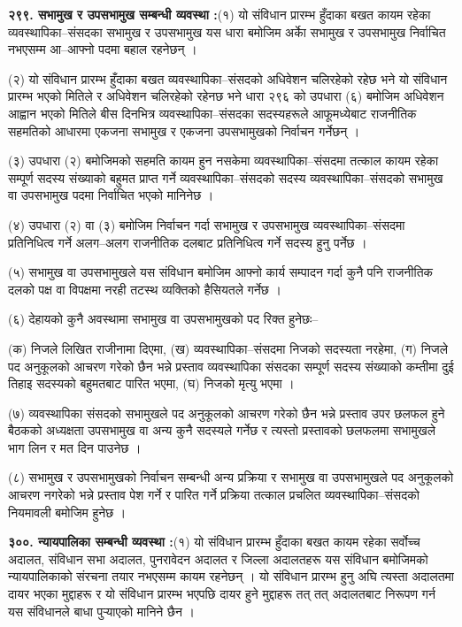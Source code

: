 \textbf{२९९. सभामुख र उपसभामुख सम्बन्धी व्यवस्था :}(१) यो संविधान प्रारम्भ हुँदाका बखत कायम रहेका व्यवस्थापिका–संसदका सभामुख र उपसभामुख यस धारा बमोजिम अर्काे सभामुख र उपसभामुख निर्वाचित नभएसम्म आ–आफ्नो पदमा बहाल रहनेछन् ।

(२) यो संविधान प्रारम्भ हुँदाका बखत व्यवस्थापिका–संसदको अधिवेशन चलिरहेको रहेछ भने यो संविधान प्रारम्भ भएको मितिले र अधिवेशन चलिरहेको रहेनछ भने धारा २९६ को उपधारा (६) बमोजिम अधिवेशन आह्वान भएको मितिले बीस दिनभित्र व्यवस्थापिका–संसदका सदस्यहरूले आफूमध्येबाट राजनीतिक सहमतिको आधारमा एकजना सभामुख र एकजना उपसभामुखको निर्वाचन गर्नेछन् ।

(३) उपधारा (२) बमोजिमको सहमति कायम हुन नसकेमा व्यवस्थापिका–संसदमा तत्काल कायम रहेका सम्पूर्ण सदस्य संख्याको बहुमत प्राप्त गर्ने व्यवस्थापिका–संसदको सदस्य व्यवस्थापिका–संसदको सभामुख वा उपसभामुख पदमा निर्वाचित भएको मानिनेछ ।

(४) उपधारा (२) वा (३) बमोजिम निर्वाचन गर्दा सभामुख र उपसभामुख व्यवस्थापिका–संसदमा प्रतिनिधित्व गर्ने अलग–अलग राजनीतिक दलबाट प्रतिनिधित्व गर्ने सदस्य हुनु पर्नेछ ।

(५) सभामुख वा उपसभामुखले यस संविधान बमोजिम आफ्नो कार्य सम्पादन गर्दा कुनै पनि राजनीतिक दलको पक्ष वा विपक्षमा नरही तटस्थ व्यक्तिको हैसियतले गर्नेछ ।

(६) देहायको कुनै अवस्थामा सभामुख वा उपसभामुखको पद रिक्त हुनेछः–

(क) निजले लिखित राजीनामा दिएमा,
(ख) व्यवस्थापिका–संसदमा निजको सदस्यता नरहेमा,
(ग) निजले पद अनुकूलको आचरण गरेको छैन भन्ने प्रस्ताव व्यवस्थापिका संसदका सम्पूर्ण सदस्य संख्याको कम्तीमा दुई तिहाइ सदस्यको बहुमतबाट पारित भएमा,
(घ) निजको मृत्यु भएमा ।

(७) व्यवस्थापिका संसदको सभामुखले पद अनुकूलको आचरण गरेको छैन भन्ने प्रस्ताव उपर छलफल हुने बैठकको अध्यक्षता उपसभामुख वा अन्य कुनै सदस्यले गर्नेछ र त्यस्तो प्रस्तावको छलफलमा सभामुखले भाग लिन र मत दिन पाउनेछ ।

(८) सभामुख र उपसभामुखको निर्वाचन सम्बन्धी अन्य प्रक्रिया र सभामुख वा उपसभामुखले पद अनुकूलको आचरण नगरेको भन्ने प्रस्ताव पेश गर्ने र पारित गर्ने प्रक्रिया तत्काल प्रचलित व्यवस्थापिका–संसदको नियमावली बमोजिम हुनेछ ।

\textbf{३००. न्यायपालिका सम्बन्धी व्यवस्था :}(१) यो संविधान प्रारम्भ हुँदाका बखत कायम रहेका सर्वोच्च अदालत, संविधान सभा अदालत, पुनरावेदन अदालत र जिल्ला अदालतहरू यस संविधान बमोजिमको न्यायपालिकाको संरचना तयार नभएसम्म कायम रहनेछन् । यो संविधान प्रारम्भ हुनु अघि त्यस्ता अदालतमा दायर भएका मुद्दाहरू र यो संविधान प्रारम्भ भएपछि दायर हुने मुद्दाहरू तत् तत् अदालतबाट निरूपण गर्न यस संविधानले बाधा पुर्‍याएको मानिने छैन ।

